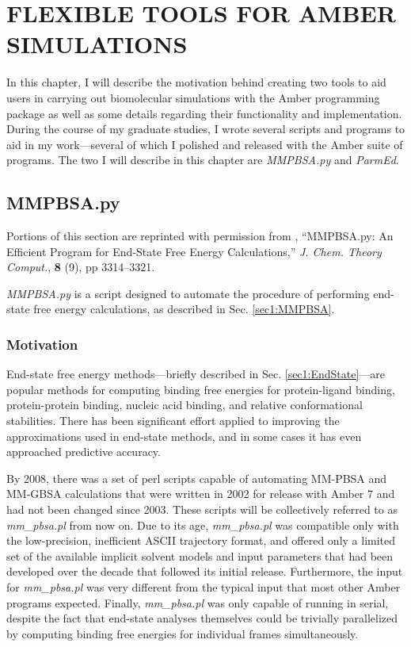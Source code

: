 \chapter{FLEXIBLE TOOLS FOR AMBER SIMULATIONS}
\label{ch6}

In this chapter, I will describe the motivation behind creating two tools to aid
users in carrying out biomolecular simulations with the Amber programming
package as well as some details regarding their functionality and
implementation. During the course of my graduate studies, I wrote several
scripts and programs to aid in my work---several of which I polished and released
with the Amber suite of programs. The two I will describe in this chapter are
\emph{MMPBSA.py} \cite{MMPBSApy} and \emph{ParmEd}.

\section{MMPBSA.py}

Portions of this section are reprinted with permission from
\citeauthor*{MMPBSApy}, ``MMPBSA.py: An Efficient Program for End-State Free
Energy Calculations,'' \emph{J. Chem. Theory Comput.}, \textbf{8} (9), pp
3314--3321. \cite{MMPBSApy}

\emph{MMPBSA.py} is a script designed to automate the procedure of performing
end-state free energy calculations, as described in Sec. \ref{sec1:MMPBSA}.

\subsection{Motivation}

End-state free energy methods---briefly described in Sec.
\ref{sec1:EndState}---are popular methods for computing binding free energies
for protein-ligand binding, \cite{Wang2001, Kuhn2005, Weis2006, Genheden2009,
Wang2001a} protein-protein binding, \cite{Gohlke2003, Gohlke2004, Bradshaw2010,
Wang2001a} nucleic acid binding, \cite{Gouda2002, Wang2001a} and relative
conformational stabilities. \cite{Combelles2008, Brice2011} There has been
significant effort applied to improving the approximations used in end-state
methods, and in some cases it has even approached predictive accuracy.
\cite{Genheden2009, Mikulskis2012}

By 2008, there was a set of perl scripts capable of automating MM-PBSA and
MM-GBSA calculations that were written in 2002 for release with Amber 7 and had
not been changed since 2003. These scripts will be collectively referred to as
\emph{mm\_pbsa.pl} from now on. Due to its age, \emph{mm\_pbsa.pl} was
compatible only with the low-precision, inefficient ASCII trajectory format,
and offered only a limited set of the available implicit solvent models and
input parameters that had been developed over the decade that followed its
initial release. Furthermore, the input for \emph{mm\_pbsa.pl} was very
different from the typical input that most other Amber programs expected.
Finally, \emph{mm\_pbsa.pl} was only capable of running in serial, despite the
fact that end-state analyses themselves could be trivially parallelized by
computing binding free energies for individual frames simultaneously.

